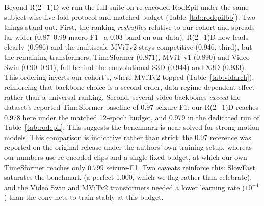 Beyond R(2+1)D we run the full suite on re-encoded RodEpil under the same
subject-wise five-fold protocol and matched budget (Table~\ref{tab:rodepilbb}). Two things stand out. First, the ranking \emph{reshuffles} relative to our cohort
and spreads far wider (0.87--0.99 macro-F1 \vs\ a 0.03 band on our data). R(2+1)D
now leads clearly (0.986) and the multiscale MViTv2 stays competitive (0.946,
third), but the remaining transformers, TimeSformer (0.871), MViT-v1 (0.890) and Video Swin (0.90--0.91), fall behind the convolutional S3D (0.944) and X3D
(0.933). This ordering inverts our cohort's, where MViTv2 topped
(Table~\ref{tab:vidarch}), reinforcing that backbone choice is a second-order,
data-regime-dependent effect rather than a universal ranking. Second, several video backbones
\emph{exceed} the dataset's
reported TimeSformer baseline of 0.97 seizure-F1: our R(2+1)D reaches 0.978 here under the matched 12-epoch budget, and 0.979 in the dedicated run of Table~\ref{tab:rodepil}. This suggests the benchmark is near-solved for strong
motion models. This comparison is indicative rather than strict: the 0.97
reference was reported on the original release under the authors' own training
setup, whereas our numbers use re-encoded clips and a single fixed budget, at
which our own TimeSformer reaches only 0.799 seizure-F1. Two caveats reinforce
this: SlowFast saturates the benchmark (a perfect 1.000, which we flag rather than
celebrate), and the Video Swin and MViTv2 transformers needed a lower learning
rate ($10^{-4}$) than the conv nets to train stably at this budget.

